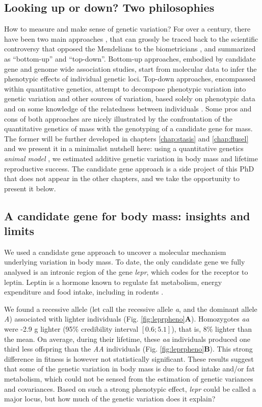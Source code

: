 \subsection{Looking up or down? Two philosophies}
How to measure and make sense of genetic variation?
For over a century, there have been two main approaches \parencite{Liedvogel2012}, that can grossly be traced back to the scientific controversy that opposed the Mendelians to the biometricians \parencite{Dietrich2006}, and summarized as ``bottom-up'' and ``top-down''. 
Bottom-up approaches, embodied by candidate gene and genome wide association studies, start from molecular data to infer the phenotypic effects of individual genetic loci. 
Top-down approaches, encompassed within quantitative genetics, attempt to decompose phenotypic variation into genetic variation and other sources of variation, based solely on phenotypic data and on some knowledge of the relatedness between individuals \parencite{Lynch1998}. 
Some pros and cons of both approaches are nicely illustrated by the confrontation of the quantitative genetics of mass with the genotyping of a candidate gene for mass. The former will be further developed in chapters \ref{chap:stasis} and \ref{chap:flusel} and we present it in a minimalist nutshell here: using a quantitative genetics \emph{animal model} \parencite{Henderson1950, Kruuk2004}, we estimated additive genetic variation in body mass and lifetime reproductive success. The candidate gene approach is a side project of this PhD that does not appear in the other chapters, and we take the opportunity to present it below.

\subsection{A candidate gene for body mass: insights and limits}
We used a candidate gene approach \parencite{Fitzpatrick2005} to uncover a molecular mechanism underlying variation in body mass. To date, the only candidate gene we fully analysed is an intronic region of the gene \emph{lepr}, which codes for the receptor to leptin. Leptin is a hormone known to regulate fat metabolism, energy expenditure and food intake, including in rodents \parencite{Houseknecht1998}.

We found a recessive allele (let call the recessive allele \emph{a}, and the dominant allele \emph{A}) associated with lighter individuals (Fig. \ref{fig:leprpheno}\textbf{A}). Homozygotes \emph{aa} were -2.9 g lighter (95\% credibility interval $[0.6;5.1]$), that is, 8\% lighter than the mean. On average, during their lifetime, these \emph{aa} individuals produced one third less offspring than the \emph{AA} individuals (Fig. \ref{fig:leprpheno}\textbf{B}). This strong difference in fitness is however not statistically significant. These results suggest that some of the genetic variation in body mass is due to food intake and/or fat metabolism, which could not be sensed from the estimation of genetic variances and covariances. 
Based on such a strong phenotypic effect, \emph{lepr} could be called a major locus, but how much of the genetic variation does it explain?

